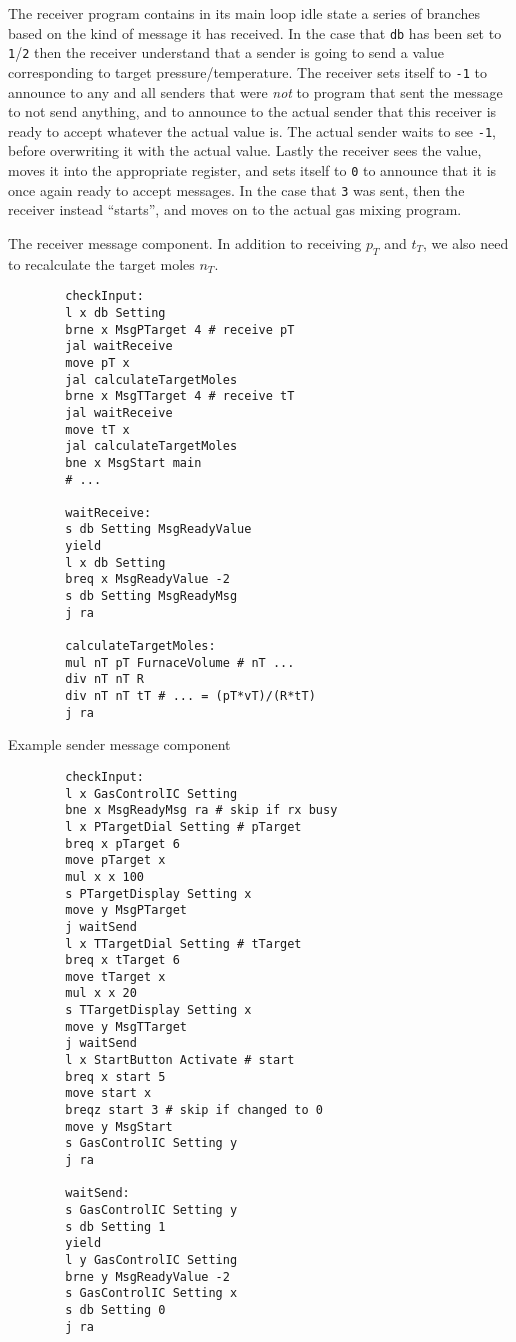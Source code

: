 \documentclass{article}
\begin{document}
The receiver program contains in its main loop idle state
a series of branches based on the kind of message it has received.
In the case that \verb+db+ has been set to \verb+1+/\verb+2+ then
the receiver understand that a sender is going to send a value corresponding
to target pressure/temperature. The receiver sets itself to \verb+-1+ to
announce to any and all senders that were \emph{not} to program that sent
the message to not send anything, and to announce to the actual sender that
this receiver is ready to accept whatever the actual value is. The actual
sender waits to see \verb+-1+, before overwriting it with the actual value.
Lastly the receiver sees the value, moves it into the appropriate register,
and sets itself to \verb+0+ to announce that it is once again ready to
accept messages. In the case that \verb+3+ was sent, then the receiver instead
``starts'', and moves on to the actual gas mixing program.
\vspace{1em}
\begin{paracol}{2}
    \noindent
    The receiver message component.
    In addition to receiving $p_T$ and $t_T$,
    we also need to recalculate the target moles $n_T$.
    \begin{verbatim}
        checkInput:
        l x db Setting
        brne x MsgPTarget 4 # receive pT
        jal waitReceive
        move pT x
        jal calculateTargetMoles
        brne x MsgTTarget 4 # receive tT
        jal waitReceive
        move tT x
        jal calculateTargetMoles
        bne x MsgStart main
        # ...

        waitReceive:
        s db Setting MsgReadyValue
        yield
        l x db Setting
        breq x MsgReadyValue -2
        s db Setting MsgReadyMsg
        j ra

        calculateTargetMoles:
        mul nT pT FurnaceVolume # nT ...
        div nT nT R
        div nT nT tT # ... = (pT*vT)/(R*tT)
        j ra
    \end{verbatim}
    \switchcolumn
    \noindent
    Example sender message component
    \begin{verbatim}
        checkInput:
        l x GasControlIC Setting
        bne x MsgReadyMsg ra # skip if rx busy
        l x PTargetDial Setting # pTarget
        breq x pTarget 6
        move pTarget x
        mul x x 100
        s PTargetDisplay Setting x
        move y MsgPTarget
        j waitSend
        l x TTargetDial Setting # tTarget
        breq x tTarget 6
        move tTarget x
        mul x x 20
        s TTargetDisplay Setting x
        move y MsgTTarget
        j waitSend
        l x StartButton Activate # start
        breq x start 5
        move start x
        breqz start 3 # skip if changed to 0
        move y MsgStart
        s GasControlIC Setting y
        j ra

        waitSend:
        s GasControlIC Setting y
        s db Setting 1
        yield
        l y GasControlIC Setting
        brne y MsgReadyValue -2
        s GasControlIC Setting x
        s db Setting 0
        j ra
    \end{verbatim}
\end{paracol}
\end{document}
